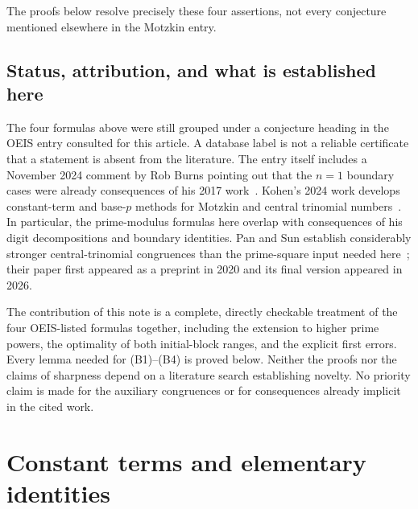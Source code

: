 \documentclass[11pt,a4paper]{article}
\numberwithin{equation}{section}
\theoremstyle{definition}
\theoremstyle{remark}
\begin{document}
The proofs below resolve precisely these four assertions, not every
conjecture mentioned elsewhere in the Motzkin entry.

\subsection{Status, attribution, and what is established here}\label{sec:status}
The four formulas above were still grouped under a conjecture heading in
the OEIS entry consulted for this article. A database label is not a
reliable certificate that a statement is absent from the literature.
The entry itself includes a November 2024 comment by Rob Burns pointing
out that the $n=1$ boundary cases were already consequences of his
2017 work~\cite{oeisM}.
Kohen's 2024 work develops constant-term and base-$p$ methods for Motzkin
and central trinomial numbers~\cite{kohenUniform,kohenDensity}. In
particular, the prime-modulus formulas here overlap with consequences of
his digit decompositions and boundary identities. Pan and Sun establish
considerably stronger central-trinomial congruences than the prime-square
input needed here~\cite{panSun}; their paper first appeared as a preprint
in 2020 and its final version appeared in 2026.

The contribution of this note is a complete, directly checkable treatment
of the four OEIS-listed formulas together, including the extension to
higher prime powers, the optimality of both initial-block ranges, and the
explicit first errors. Every lemma needed for (B1)--(B4) is proved below.
Neither the proofs nor the claims of sharpness depend on a literature
search establishing novelty. No priority claim is made for the auxiliary
congruences or for consequences already implicit in the cited work.

\section{Constant terms and elementary identities}\label{sec:constant}
\end{document}
